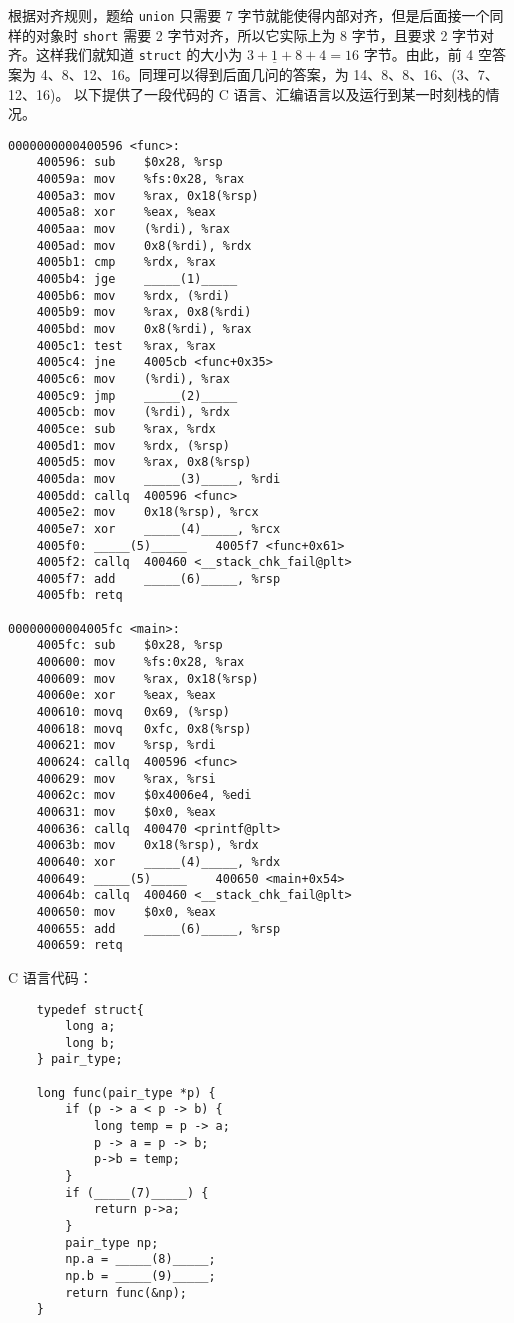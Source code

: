 \begin{problems}
        根据对齐规则，题给 \verb|union| 只需要 7 字节就能使得内部对齐，但是后面接一个同样的对象时 \verb|short| 需要 2 字节对齐，所以它实际上为 8 字节，且要求 2 字节对齐。这样我们就知道 \verb|struct| 的大小为 $3 + \underline 1 + 8+4=16$ 字节。由此，前 4 空答案为 4、8、12、16。同理可以得到后面几问的答案，为 14、8、8、16、(3、7、12、16)。
        \pro 以下提供了一段代码的 C 语言、汇编语言以及运行到某一时刻栈的情况。
        \begin{verbatim}
0000000000400596 <func>: 
    400596: sub    $0x28, %rsp
    40059a: mov    %fs:0x28, %rax
    4005a3: mov    %rax, 0x18(%rsp)
    4005a8: xor    %eax, %eax
    4005aa: mov    (%rdi), %rax
    4005ad: mov    0x8(%rdi), %rdx
    4005b1: cmp    %rdx, %rax
    4005b4: jge    _____(1)_____
    4005b6: mov    %rdx, (%rdi)
    4005b9: mov    %rax, 0x8(%rdi)
    4005bd: mov    0x8(%rdi), %rax
    4005c1: test   %rax, %rax
    4005c4: jne    4005cb <func+0x35>
    4005c6: mov    (%rdi), %rax
    4005c9: jmp    _____(2)_____
    4005cb: mov    (%rdi), %rdx
    4005ce: sub    %rax, %rdx
    4005d1: mov    %rdx, (%rsp)
    4005d5: mov    %rax, 0x8(%rsp)
    4005da: mov    _____(3)_____, %rdi
    4005dd: callq  400596 <func>
    4005e2: mov    0x18(%rsp), %rcx
    4005e7: xor    _____(4)_____, %rcx
    4005f0: _____(5)_____    4005f7 <func+0x61>
    4005f2: callq  400460 <__stack_chk_fail@plt>
    4005f7: add    _____(6)_____, %rsp
    4005fb: retq
 
00000000004005fc <main>: 
    4005fc: sub    $0x28, %rsp 
    400600: mov    %fs:0x28, %rax 
    400609: mov    %rax, 0x18(%rsp) 
    40060e: xor    %eax, %eax 
    400610: movq   0x69, (%rsp) 
    400618: movq   0xfc, 0x8(%rsp) 
    400621: mov    %rsp, %rdi 
    400624: callq  400596 <func>
    400629: mov    %rax, %rsi
    40062c: mov    $0x4006e4, %edi
    400631: mov    $0x0, %eax
    400636: callq  400470 <printf@plt>
    40063b: mov    0x18(%rsp), %rdx
    400640: xor    _____(4)_____, %rdx
    400649: _____(5)_____    400650 <main+0x54>
    40064b: callq  400460 <__stack_chk_fail@plt>
    400650: mov    $0x0, %eax
    400655: add    _____(6)_____, %rsp
    400659: retq
        \end{verbatim}
        C 语言代码：
        \begin{verbatim}
    typedef struct{
        long a;
        long b;
    } pair_type;

    long func(pair_type *p) {
        if (p -> a < p -> b) {
            long temp = p -> a;
            p -> a = p -> b;
            p->b = temp;
        }
        if (_____(7)_____) {
            return p->a;
        }
        pair_type np;
        np.a = _____(8)_____;
        np.b = _____(9)_____;
        return func(&np);
    } 


\end{verbatim}
\end{problems}

